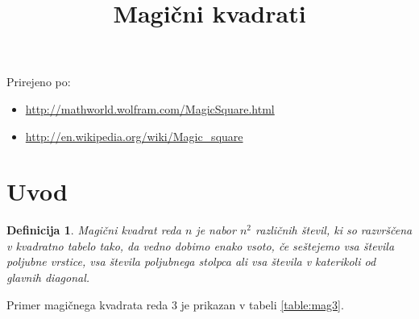 \documentclass[a4paper,12pt]{article}
\title{Magični kvadrati}
\date{}
\newtheorem{definicija}{Definicija}
\begin{document}
\maketitle

Prirejeno po:

\begin{itemize}
   \item \url{http://mathworld.wolfram.com/MagicSquare.html}
   \item \url{http://en.wikipedia.org/wiki/Magic_square}
\end{itemize}


\tableofcontents


\newpage

\section{Uvod}

\begin{definicija}
   \emph{Magični kvadrat} reda \(n\) je nabor \(n^2\) različnih števil,
   ki so razvrščena v kvadratno tabelo tako, da vedno dobimo enako vsoto,
   če seštejemo vsa števila poljubne vrstice, vsa števila poljubnega
   stolpca ali vsa števila v katerikoli od glavnih diagonal.
\end{definicija}

Primer magičnega kvadrata reda 3 je prikazan v tabeli \ref{table:mag3}. %
\end{document}
